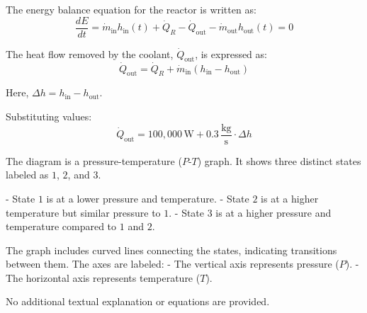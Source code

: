 The energy balance equation for the reactor is written as:  
\[
\frac{dE}{dt} = \dot{m}_{\text{in}} h_{\text{in}}(t) + \dot{Q}_R - \dot{Q}_{\text{out}} - \dot{m}_{\text{out}} h_{\text{out}}(t) = 0
\]  

The heat flow removed by the coolant, \( \dot{Q}_{\text{out}} \), is expressed as:  
\[
\dot{Q}_{\text{out}} = \dot{Q}_R + \dot{m}_{\text{in}} \left( h_{\text{in}} - h_{\text{out}} \right)
\]  

Here, \( \Delta h = h_{\text{in}} - h_{\text{out}} \).  

Substituting values:  
\[
\dot{Q}_{\text{out}} = 100,000 \, \text{W} + 0.3 \, \frac{\text{kg}}{\text{s}} \cdot \Delta h
\]

The diagram is a pressure-temperature (\(P\)-\(T\)) graph. It shows three distinct states labeled as \(1\), \(2\), and \(3\).  

- State \(1\) is at a lower pressure and temperature.  
- State \(2\) is at a higher temperature but similar pressure to \(1\).  
- State \(3\) is at a higher pressure and temperature compared to \(1\) and \(2\).  

The graph includes curved lines connecting the states, indicating transitions between them. The axes are labeled:  
- The vertical axis represents pressure (\(P\)).  
- The horizontal axis represents temperature (\(T\)).  

No additional textual explanation or equations are provided.